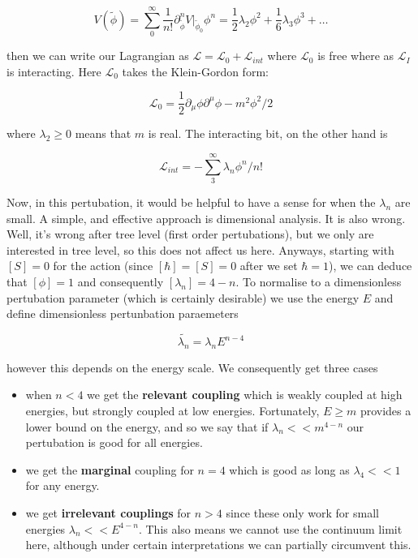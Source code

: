 \documentclass{article}
\theoremstyle{definition}
\begin{document}
$$ V(\tilde{\phi}) = \sum_0^\infty \frac{1}{n!} \partial_{\tilde{\phi}}^n V
|_{\tilde{\phi}_0} \phi^n = \frac{1}{2} \lambda_2 \phi^2 + \frac{1}{6} \lambda_3
\phi^3 + \dots $$

then we can write our Lagrangian as $\mathcal{L} = \mathcal{L}_0 +
\mathcal{L}_{int}$ where $\mathcal{L}_0$ is free where as $\mathcal{L}_I$ is
interacting. Here $\mathcal{L}_0$ takes the Klein-Gordon form:

$$ \mathcal{L}_0 = \frac{1}{2} \partial_\mu \phi \partial^\mu \phi - m^2 \phi^2
/ 2 $$

where $\lambda_2 \geq 0$ means that $m$ is real. The interacting bit, on the
other hand is

$$ \mathcal{L}_{int} = - \sum_3^\infty \lambda_n \phi^n / n! $$

Now, in this pertubation, it would be helpful to have a sense for when the
$\lambda_n$ are small. A simple, and effective approach is dimensional analysis.
It is also wrong. Well, it's wrong after tree level (first order pertubations),
but we only are interested in tree level, so this does not affect us here.
Anyways, starting with $[S] = 0$ for the action (since $[\hbar] = [S] = 0$ after
we set $\hbar = 1$), we can deduce that $[\phi] = 1$ and consequently
$[\lambda_n] = 4 - n$. To normalise to a dimensionless pertubation parameter
(which is certainly desirable) we use the energy $E$ and define dimensionless
pertunbation paraemeters

$$ \tilde{\lambda_n} = \lambda_n E^{n - 4} $$

however this depends on the energy scale. We consequently get three cases

\begin{itemize}
  \item when $n < 4$ we get the \textbf{relevant coupling} which is weakly
    coupled at high energies, but strongly coupled at low energies. Fortunately,
    $E \geq m$ provides a lower bound on the energy, and so we say that if
    $\lambda_n << m^{4 - n}$ our pertubation is good for all energies.
  \item we get the \textbf{marginal} coupling for $n = 4$ which is good as long
    as $\lambda_4 << 1$ for any energy.
  \item we get \textbf{irrelevant couplings} for $n > 4$ since these only work
    for small energies $\lambda_n << E^{4 - n}$. This also means we cannot use
    the continuum limit here, although under certain interpretations we can
    partially circumvent this.
\end{itemize}
\end{document}
